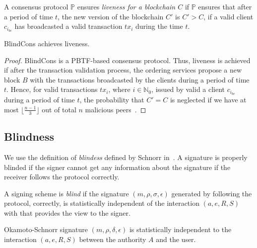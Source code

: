\documentclass[conference]{llncs}
\newcommand{\name}{BlindCons}
\begin{document}
\begin{definition}[Liveness]
A consensus protocol $\mathbb{P}$ ensures \emph{liveness for a blockchain $C$} if $\mathbb{P}$ ensures that after a period of time $t$, the new version of the blockchain $C'$ is $C' > C$, if a valid client $c_{i_{bc}}$ has broadcasted a valid transaction $tx_i$ during the time $t$. 
\end{definition}

\begin{theorem}
\name{} achieves liveness.
\end{theorem}

\begin{proof}
\name{} is a PBTF-based consensus protocol. Thus, liveness is achieved if after the transaction validation process, the ordering services propose a new block $B$ with the transactions broadcasted by the clients during a period of time $t$. Hence, for valid transactions $tx_i$, where $i\in \mathbb{N}_0$, issued by valid a client $c_{i_{bc}}$ during a period of time $t$, the probability that $C'= C$ is neglected if we have at most $\lfloor\frac{n-1}{3}\rfloor$ out of total $n$ malicious peers~\cite{castro1999practical}.
\end{proof}

\subsection{Blindness}

We use the definition of \emph{blindess} defined by Schnorr in~\cite{schnorr2001security}. A signature is properly blinded if the signer cannot get any information about the signature if the receiver follows the protocol correctly.

\begin{definition}
A signing scheme is \emph{blind} if the signature $(m,\rho,\sigma,\epsilon)$ generated by following the protocol, correctly, is statistically independent of the interaction $(a,e,R,S)$ with that provides the view to the signer.
\end{definition}

\begin{theorem}
Okamoto-Schnorr signature $(m,\rho,\delta,\epsilon)$ is statistically independent to the interaction $(a,e,R,S)$ between the authority $A$ and the user.
\end{theorem}
\end{document}
